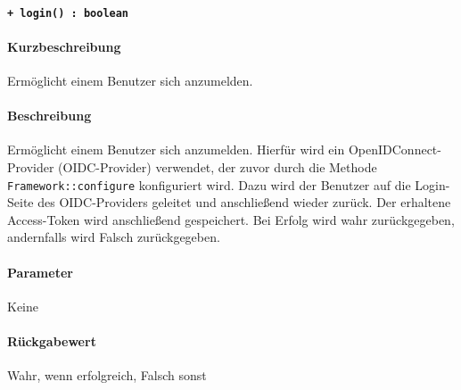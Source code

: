 \paragraph{\texttt{+ login() : boolean}}%
\paragraph*{Kurzbeschreibung}
Ermöglicht einem Benutzer sich anzumelden.
\paragraph*{Beschreibung}
Ermöglicht einem Benutzer sich anzumelden.
Hierfür wird ein OpenIDConnect-Provider (OIDC-Provider) verwendet, der zuvor durch die Methode \verb#Framework::configure# konfiguriert wird.
Dazu wird der Benutzer auf die Login-Seite des OIDC-Providers geleitet und anschließend wieder zurück.
Der erhaltene Access-Token wird anschließend gespeichert.
Bei Erfolg wird wahr zurückgegeben, andernfalls wird Falsch zurückgegeben.
\paragraph*{Parameter}
Keine
\paragraph*{Rückgabewert}
Wahr, wenn erfolgreich, Falsch sonst

